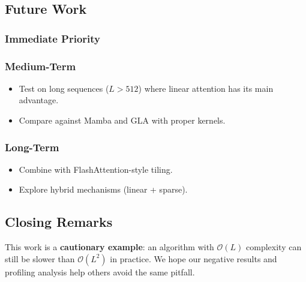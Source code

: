 \subsection{Future Work}

\subsubsection{Immediate Priority}

\subsubsection{Medium-Term}

\begin{itemize}
\item Test on long sequences ($L > 512$) where linear attention has its main
  advantage.
\item Compare against Mamba and GLA with proper kernels.

\end{itemize}
\subsubsection{Long-Term}

\begin{itemize}
\item Combine with FlashAttention-style tiling.
\item Explore hybrid mechanisms (linear + sparse).

\end{itemize}
\subsection{Closing Remarks}

This work is a \textbf{cautionary example}: an algorithm with $\mathcal{O}(L)$ 
complexity can still be slower than $\mathcal{O}(L^2)$ in practice. We 
hope our negative results and profiling analysis help others avoid the 
same pitfall.

